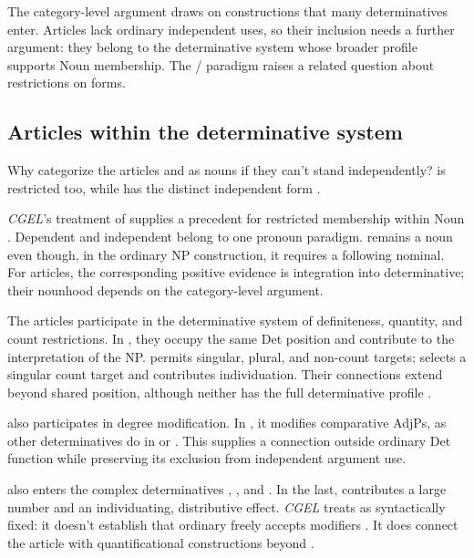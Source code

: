 \documentclass[12pt]{article}
\begin{document}
The category-level argument draws on constructions that many determinatives enter. Articles lack ordinary independent uses, so their inclusion needs a further argument: they belong to the determinative system whose broader profile supports Noun membership. The / paradigm raises a related question about restrictions on forms.

\subsection{Articles within the determinative system}\label{sec:article-membership}

Why categorize the articles  and  as nouns if they can't stand independently?  is restricted too, while  has the distinct independent form  \citep[371--372, 410--411]{huddleston2002}.

\textit{CGEL}'s treatment of  supplies a precedent for restricted membership within Noun \citep[470--471]{huddleston2002}. Dependent  and independent  belong to one pronoun paradigm.  remains a noun even though, in the ordinary NP construction, it requires a following nominal. For articles, the corresponding positive evidence is integration into determinative; their nounhood depends on the category-level argument.

The articles participate in the determinative system of definiteness, quantity, and count restrictions. In , they occupy the same Det position and contribute to the interpretation of the NP.  permits singular, plural, and non-count targets;  selects a singular count target and contributes individuation. Their connections extend beyond shared position, although neither has the full determinative profile \citep[368--373]{huddleston2002}.

 also participates in degree modification. In , it modifies comparative AdjPs, as other determinatives do in  or  \citep[1131--1132, 1135--1136]{huddleston2002}. This supplies a connection outside ordinary Det function while preserving its exclusion from independent argument use.

 also enters the complex determinatives , , and . In the last,  contributes a large number and  an individuating, distributive effect. \textit{CGEL} treats  as syntactically fixed: it doesn't establish that ordinary  freely accepts modifiers \citep[392--394]{huddleston2002}. It does connect the article with quantificational constructions beyond .
\end{document}
